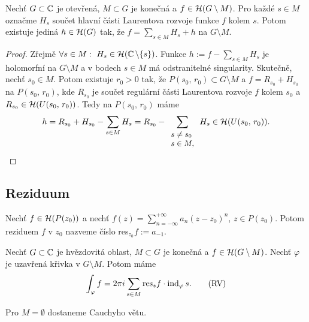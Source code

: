 \begin{theorem}
Nechť $G \subset \operatorname{\mathbb{C}} $ je otevřená, $M \subset G$ je konečná a $f \in \operatorname{\mathcal{H}} (G \setminus M)$. Pro každé $s \in M$ označme $H_s$ součet hlavní části Laurentova rozvoje funkce $f$ kolem $s$. Potom existuje jediná $h \in \operatorname{\mathcal{H}} (G)$ tak, že $f=\sum\limits_{s\in M} H_s+h$ na $G \setminus M$.
\end{theorem}
\begin{proof}
Zřejmě $\forall s \in M:\ H_s \in \Holo (\Comp  \setminus \{s \})$. Funkce $h:=f-\sum\limits_{s\in M} H_s$ je holomorfní na $G \setminus M$ a v bodech $s \in M$ má odstranitelné singularity. Skutečně, nechť $s_0 \in M$. Potom existuje $r_0>0$ tak, že $P(s_0,\,r_0) \subset G \setminus M$ a $f=R_{s_0}+H_{s_0}$ na $P(s_0,\,r_0)$, kde $R_{s_0}$ je součet regulární části Laurentova rozvoje $f$ kolem $s_0$ a $R_{s_0}\in \operatorname{\mathcal{H}} (U(s_0,\,r_0))$. Tedy na $P(s_0,\,r_0)$ máme
$$h=R_{s_0}+H_{s_0}-\sum\limits_{s\in M} H_s=R_{s_0}-\sum\limits_{
\small{\begin{array}l
s \neq s_0\\
s\in M,
\end{array}}}
H_s \in \Holo (U(s_0,\,r_0)).$$
\end{proof}

\subsection{Reziduum}
\begin{definition}
Nechť $f \in \operatorname{\mathcal{H}} (P(z_0))$ a nechť $f(z)=\sum\limits_{n=-\infty}^{+\infty}a_n(z-z_0)^n$, $z\in P(z_0)$. Potom reziduem $f$ v $z_0$ nazveme číslo res$_{z_0}f:=a_{-1}$.
\end{definition}

\begin{theorem}
Nechť $G \subset \operatorname{\mathbb{C}} $ je hvězdovitá oblast, $M \subset G$ je konečná a $f \in \operatorname{\mathcal{H}} (G \setminus M)$. Nechť $\varphi$ je uzavřená křivka v $G \setminus M$. Potom máme 
\begin{equation}
    \int_\varphi f=2\pi i \sum\limits_{s\in M}\text{res}_sf \cdot \operatorname{ind}_\varphi s.
    \tag{RV}
    \label{eqn:7.31.RV}
\end{equation}
\end{theorem}

\begin{note*}
Pro $M=\emptyset$ dostaneme Cauchyho větu.
\end{note*}

